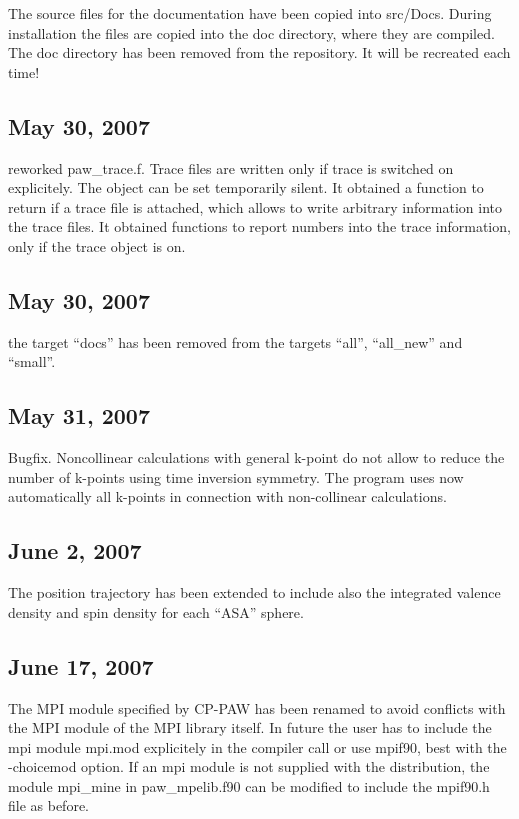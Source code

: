 \documentclass[final,12pt]{article}
\begin{document}
The source files for the documentation have been copied into src/Docs.
During installation the files are copied into the doc directory, where
they are compiled. The doc directory has been removed from the
repository. It will be recreated each time!

\subsection{May 30,  2007}

reworked paw\_trace.f. Trace files are written only if trace is
switched on explicitely.  The object can be set temporarily silent. It
obtained a function to return if a trace file is attached, which
allows to write arbitrary information into the trace files. It
obtained functions to report numbers into the trace information, only
if the trace object is on.

\subsection{May 30,  2007}

the target ``docs'' has been removed from the targets ``all'',
``all\_new'' and ``small''.

\subsection{May 31,  2007}

Bugfix. Noncollinear calculations with general k-point do not allow to
reduce the number of k-points using time inversion symmetry. The
program uses now automatically all k-points in connection with
non-collinear calculations.

\subsection{June 2,  2007}

The position trajectory has been extended to include also the
integrated valence density and spin density for each ``ASA'' sphere.

\subsection{June 17,  2007}

The MPI module specified by CP-PAW has been renamed to avoid conflicts
with the MPI module of the MPI library itself.  In future the user has
to include the mpi module mpi.mod explicitely in the compiler call or
use mpif90, best with the -choicemod option. If an mpi module is not
supplied with the distribution, the module mpi\_mine in paw\_mpelib.f90
can be modified to include the mpif90.h file as before.
\end{document}
